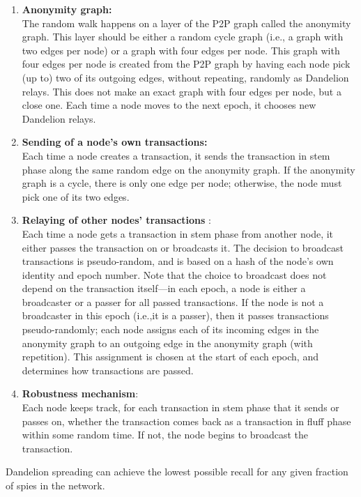 \documentclass{report}
\begin{document}
\begin{enumerate}
	\item \textbf{Anonymity graph:}\\ The random walk happens on a layer of the P2P graph called the anonymity graph. This layer should be either a random cycle graph (i.e., a graph with two edges per node) or a graph with four edges per node. This graph with four edges per node is created from the P2P graph by having each node pick (up to) two of its outgoing edges, without repeating, randomly as Dandelion relays. This does not make an exact graph with four edges per node, but a close one. Each time a node moves to the next epoch, it chooses new Dandelion relays.
	\item \textbf{Sending of a node’s own transactions:}\\ Each time a node creates a transaction, it sends the transaction in stem phase along the same random edge on the anonymity graph. If the anonymity graph is a cycle, there is only one edge per node; otherwise, the node must pick one of its two edges.
	\item \textbf{Relaying of other nodes’ transactions} : \\  Each time a node gets a transaction in stem phase from another node, it either passes the transaction on or broadcasts it. The decision to broadcast transactions is pseudo-random, and is based on a hash of the node’s own identity and epoch number. Note that the choice to broadcast does not depend on the transaction itself—in each epoch, a node is either a broadcaster or a passer for all passed transactions. If the node is not a broadcaster in this epoch (i.e.,it is a passer), then it passes transactions pseudo-randomly; each node assigns each of its incoming edges in the anonymity graph to an outgoing edge in the anonymity graph (with repetition). This assignment is chosen at the start of each epoch, and determines how transactions are passed.
	\item \textbf{Robustness mechanism}:\\ Each node keeps track, for each transaction in stem phase that it sends or passes on, whether the transaction comes back as a transaction in fluff phase within some random time. If not, the node begins to broadcast the transaction.
\end{enumerate}
Dandelion spreading can achieve the lowest possible recall for any given fraction of spies in the network. 
\end{document}
